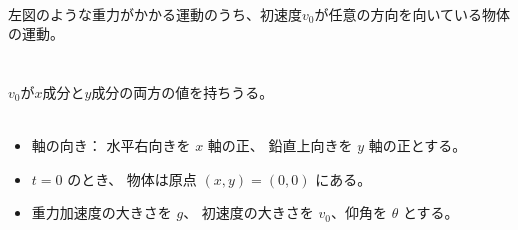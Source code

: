 \documentclass[11pt,twoside]{article}
\begin{document}
		\begin{minipage}[t]{0.52\linewidth}
			\\
			左図のような重力がかかる運動のうち、初速度$v_0$が任意の方向を向いている物体の運動。\\\\
			\\
			$v_0$が$x$成分と$y$成分の両方の値を持ちうる。\\\\
				\begin{itemize}[leftmargin=2em,itemsep=0pt,topsep=2pt]
					\item[(i)]
					軸の向き：
					水平右向きを $x$ 軸の正、
					鉛直上向きを $y$ 軸の正とする。
	
					\item[(ii)]
					$t=0$ のとき、
					物体は原点 $(x,y)=(0,0)$ にある。
	
					\item[(iii)]
					重力加速度の大きさを $g$、
					初速度の大きさを $v_0$、仰角を $\theta$ とする。
	

\end{itemize}
\end{minipage}
\end{document}
